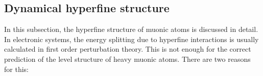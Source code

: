 %

\subsection{Dynamical hyperfine structure}
\label{sec:muon_dynamic}
In this subsection, the hyperfine structure of muonic atoms is discussed in detail. In electronic systems, the energy splitting due to hyperfine interactions is usually calculated in first order perturbation theory. This is not enough for the correct prediction of the level structure of heavy muonic atoms.  There are two reasons for this:

